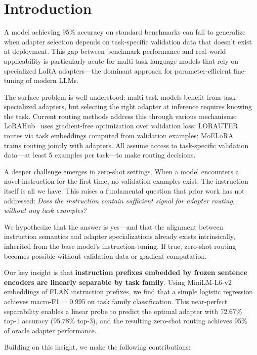 \section{Introduction}

A model achieving 95\% accuracy on standard benchmarks can fail to generalize when adapter selection depends on task-specific validation data that doesn't exist at deployment. This gap between benchmark performance and real-world applicability is particularly acute for multi-task language models that rely on specialized LoRA adapters---the dominant approach for parameter-efficient fine-tuning of modern LLMs.

The surface problem is well understood: multi-task models benefit from task-specialized adapters, but selecting the right adapter at inference requires knowing the task. Current routing methods address this through various mechanisms: LoRAHub~\cite{huang2023lorahub} uses gradient-free optimization over validation loss; LORAUTER~\cite{dhasade2026lorauter} routes via task embeddings computed from validation examples; MoELoRA~\cite{luo2024moelora} trains routing jointly with adapters. All assume access to task-specific validation data---at least 5 examples per task---to make routing decisions.

A deeper challenge emerges in zero-shot settings. When a model encounters a novel instruction for the first time, no validation examples exist. The instruction itself is all we have. This raises a fundamental question that prior work has not addressed: \emph{Does the instruction contain sufficient signal for adapter routing, without any task examples?}

We hypothesize that the answer is yes---and that the alignment between instruction semantics and adapter specializations already exists intrinsically, inherited from the base model's instruction-tuning. If true, zero-shot routing becomes possible without validation data or gradient computation.

Our key insight is that \textbf{instruction prefixes embedded by frozen sentence encoders are linearly separable by task family}. Using MiniLM-L6-v2 embeddings of FLAN instruction prefixes, we find that a simple logistic regression achieves macro-F1 = 0.995 on task family classification. This near-perfect separability enables a linear probe to predict the optimal adapter with 72.67\% top-1 accuracy (95.78\% top-3), and the resulting zero-shot routing achieves 95\% of oracle adapter performance.

Building on this insight, we make the following contributions:

